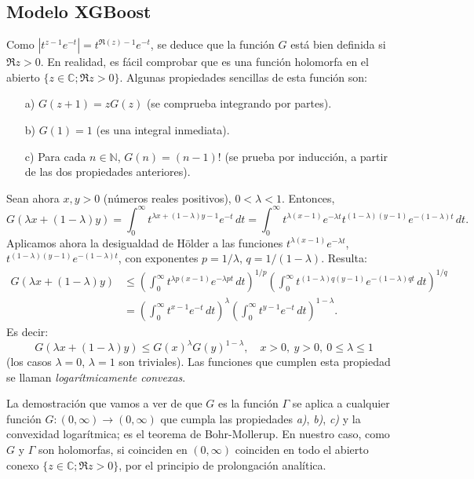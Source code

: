 \documentclass[11pt]{book}
\theoremstyle{plain} %
\theoremstyle{definition} %
\newcommand\N{\mathbb{N}}
\newcommand\C{\mathbb{C}}
\begin{document}
\subsection{Modelo XGBoost}
Como $|t^{z-1} e^{-t}| = t^{\Re(z)-1} e^{-t}$, se deduce que la función $G$ está 
bien definida si $\Re z > 0$. En realidad, es fácil comprobar que es una función 
holomorfa en el abierto $\{z \in \C; \Re z > 0\}$. 
Algunas propiedades sencillas de esta función son:
\begin{enumerate}
\item[a)] $G(z+1) = z G(z)$ (se comprueba integrando por partes).
\item[b)] $G(1) = 1$ (es una integral inmediata).
\item[c)] Para cada $n \in \N$, $G(n) = (n-1)!$ (se prueba por inducción, a 
partir de las dos propiedades anteriores).
\end{enumerate}
Sean ahora $x, y > 0$ (números reales positivos), $0 < \lambda < 1$. Entonces,
\[
   G(\lambda x + (1-\lambda)y)
   = \int_0^\infty t^{\lambda x + (1-\lambda)y - 1} e^{-t} \, dt
   = \int_0^\infty t^{\lambda (x-1)} e^{-\lambda t}
   t^{(1-\lambda)(y-1)} e^{-(1-\lambda)t} \, dt.
\]
Aplicamos ahora la desigualdad de Hölder a las 
funciones $t^{\lambda (x-1)} e^{-\lambda t}$, $t^{(1-\lambda)(y-1)} e^{-(1-
\lambda)t}$, con exponentes $p = 1/\lambda$, $q = 1/(1-\lambda)$. Resulta:
\begin{align*}
   G(\lambda x + (1-\lambda)y)
   &\leq \left(\int_0^\infty t^{\lambda p (x-1)} e^{-\lambda p t}
   \, dt \right)^{1/p}
   \left(\int_0^\infty t^{(1-\lambda) q (y-1)} e^{-(1-\lambda) qt}
   \, dt \right)^{1/q}
   \\
   &= \left(\int_0^\infty t^{x-1} e^{-t} \, dt \right)^\lambda
   \left(\int_0^\infty t^{y-1} e^{-t} \, dt \right)^{1-\lambda}.
\end{align*}
Es decir:
\[
   G(\lambda x + (1-\lambda)y) \leq G(x)^\lambda G(y)^{1-\lambda},
   \quad x > 0, \ y > 0, \ 0 \leq \lambda \leq 1
\]
(los casos $\lambda = 0$, $\lambda = 1$ son triviales). Las funciones que cumplen 
esta propiedad se llaman 
\emph{logarítmicamente convexas}.

La demostración que vamos a ver de que $G$ es la función $\Gamma$ se aplica a 
cualquier función $G : (0,\infty) \to (0,\infty)$ que cumpla las propiedades 
\emph{a)}, \emph{b)}, \emph{c)} y la convexidad logarítmica; es el teorema de 
Bohr-Mollerup. En nuestro caso, como $G$ y $
\Gamma$ son holomorfas, si coinciden en $(0,\infty)$ coinciden en todo el abierto 
conexo $\{z \in \C; \Re z > 0\}$, por el principio de prolongación 
analítica.
\end{document}
